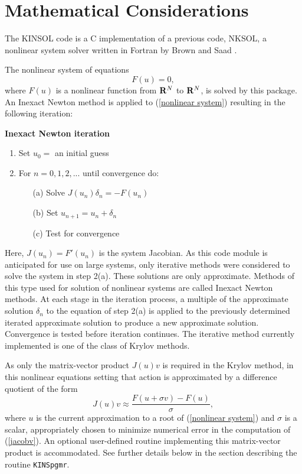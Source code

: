 \documentclass[11pt]{article}
\begin{document}
\section{Mathematical Considerations}

The KINSOL code is a C implementation of a previous code, NKSOL, a nonlinear 
system solver written in Fortran by Brown and Saad \cite{BrSa90}.
 
The nonlinear system of equations
\begin{equation}
                  F(u) = 0, 
                             \label{nonlinear system}
\end{equation}
where $F(u)$ is a nonlinear function from ${\bf R}^N$ to ${\bf R}^N$, is 
solved by this package. An Inexact Newton method is applied to (\ref{nonlinear system}) 
resulting in the following iteration:

\vspace{0.2in}
{\bf Inexact Newton iteration}
\begin{enumerate}
   \item Set $u_0 = $ an initial guess
   \item For $n = 0, 1, 2,...$ until convergence do:\nonumber 
      \begin{itemize}
          \item[(a)] Solve $J(u_n)\delta_n = - F(u_n)$ 
      \item[(b)] Set $u_{n+1} = u_n + \delta_n$
          \item[(c)] Test for convergence
      \end{itemize}
\end{enumerate}
Here, $J(u_n) = F'(u_n)$ is the system Jacobian. As this code module is
anticipated for use on large systems, only iterative methods were considered 
to solve the system in step 2(a). These solutions are only approximate. Methods
of this type used for solution of nonlinear systems are called Inexact Newton 
methods. At each stage in the iteration process, a multiple of the 
approximate solution $\delta_n$  to the equation of step 2(a) is applied 
to the previously determined iterated approximate solution to produce a new 
approximate solution. Convergence is tested before iteration continues. The 
iterative method currently implemented is one of the class of Krylov methods.

As only the matrix-vector product $J(u)v$ is required in the Krylov method, in
this nonlinear equations setting that action is approximated by a difference
quotient of the form
\begin{equation}
    J(u)v  \approx \frac {F(u+\sigma v) - F(u)}{\sigma},  \label{jacobv}
\end{equation}
where $u$ is the current approximation to a root of (\ref{nonlinear system}) 
and $\sigma$ is a scalar, appropriately chosen to minimize numerical error in 
the computation of (\ref{jacobv}). An optional user-defined routine 
implementing this matrix-vector product is accommodated. See further details 
below in the section describing the routine {\tt KINSpgmr}.
\end{document}
